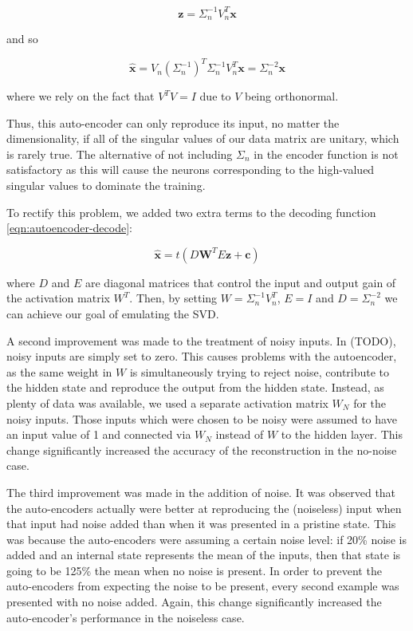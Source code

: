 \documentclass{article}
\begin{document}
\begin{equation}
\mathbf{z} = \Sigma_n^{-1} V_n^T \mathbf{x}
\end{equation}

and so

\begin{equation}
\hat{\mathbf{x}} = V_n \left( \Sigma_n^{-1} \right)^T \Sigma_n^{-1} V_n^T \mathbf{x} = \Sigma_n^{-2} \mathbf{x}
\end{equation}

where we rely on the fact that $V^T V = I$ due to $V$ being orthonormal.

Thus, this auto-encoder can only reproduce its input, no matter the dimensionality, if all of the singular values of our data matrix are unitary, which is rarely true.  The alternative of not including $\Sigma_n$ in the encoder function is not satisfactory as this will cause the neurons corresponding to the high-valued singular values to dominate the training.

To rectify this problem, we added two extra terms to the decoding function \ref{eqn:autoencoder-decode}:

\begin{equation}
\label{eqn:autoencoder-decode-improved}
\hat{\mathbf{x}} = t(D \mathbf{W}^T E \mathbf{z} + \mathbf{c})
\end{equation}

where $D$ and $E$ are diagonal matrices that control the input and output gain of the activation matrix $W^T$.  Then, by setting $W = \Sigma_n^{-1} V_n^T$, $E = I$ and $D = \Sigma_n^{-2}$ we can achieve our goal of emulating the SVD.

A second improvement was made to the treatment of noisy inputs.  In (TODO), noisy inputs are simply set to zero.  This causes problems with the autoencoder, as the same weight in $W$ is simultaneously trying to reject noise, contribute to the hidden state and reproduce the output from the hidden state.  Instead, as plenty of data was available, we used a separate activation matrix $W_N$ for the noisy inputs.  Those inputs which were chosen to be noisy were assumed to have an input value of 1 and connected via $W_N$ instead of $W$ to the hidden layer.  This change significantly increased the accuracy of the reconstruction in the no-noise case.

The third improvement was made in the addition of noise.  It was observed that the auto-encoders actually were better at reproducing the (noiseless) input when that input had noise added than when it was presented in a pristine state.  This was because the auto-encoders were assuming a certain noise level: if 20\% noise is added and an internal state represents the mean of the inputs, then that state is going to be 125\% the mean when no noise is present.  In order to prevent the auto-encoders from expecting the noise to be present, every second example was presented with no noise added.  Again, this change significantly increased the auto-encoder's performance in the noiseless case.
\end{document}
